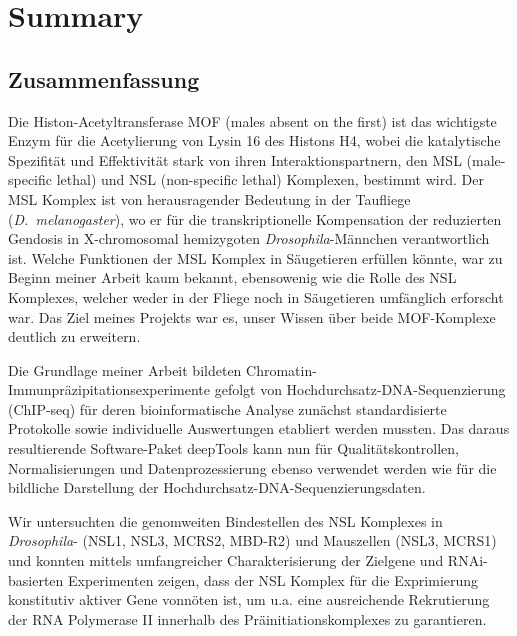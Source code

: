 
\chapter{Summary} %

\label{Abstract} %

\fancyfoot[C]{\thepage}

\section{Zusammenfassung}

Die Histon-Acetyltransferase MOF (males absent on the first) ist das wichtigste Enzym für die Acetylierung von Lysin 16 des Histons H4, wobei die katalytische Spezifität und Effektivität stark von ihren Interaktionspartnern, den MSL (male-specific lethal) und NSL (non-specific lethal) Komplexen, bestimmt wird. Der MSL Komplex ist von herausragender Bedeutung in der Taufliege (\textit{D.~melanogaster}), wo er für die transkriptionelle Kompensation der reduzierten Gendosis in X-chromosomal hemizygoten \textit{Drosophila}-Männchen verantwortlich ist. Welche Funktionen der MSL Komplex in Säugetieren erfüllen könnte, war zu Beginn meiner Arbeit kaum bekannt, ebensowenig wie die Rolle des NSL Komplexes, welcher weder in der Fliege noch in Säugetieren umfänglich erforscht war. Das Ziel meines Projekts war es, unser Wissen über beide MOF-Komplexe deutlich zu erweitern.

Die Grundlage meiner Arbeit bildeten Chromatin-Im\-mun\-prä\-zi\-pi\-ta\-tions\-ex\-pe\-ri\-men\-te ge\-folgt von Hoch\-durch\-satz-DNA-Se\-quen\-zierung (ChIP-seq) für deren bio\-in\-for\-ma\-tische Analyse zu\-nächst standardisierte Protokolle sowie individuelle Auswertungen etabliert werden mussten. Das daraus resultierende Software-Paket deepTools kann nun für Qualitätskontrollen, Normalisierungen und Datenprozessierung ebenso verwendet werden wie für die bildliche Darstellung der Hoch\-durch\-satz-DNA-Se\-quen\-zierungs\-daten.

Wir untersuchten die genomweiten Bindestellen des NSL Komplexes in \textit{Drosophila}- (NSL1, NSL3, MCRS2, MBD-R2) und Mauszellen (NSL3, MCRS1) und konnten mittels umfangreicher Charakterisierung der Zielgene und RNAi-basierten Experimenten zeigen, dass
der NSL Komplex für die Ex\-pri\-mierung konstitutiv aktiver Gene vonnöten ist, um u.a. eine ausreichende Rekrutierung der RNA Polymerase II innerhalb des Prä\-ini\-tia\-tions\-kom\-plexes zu garantieren.

